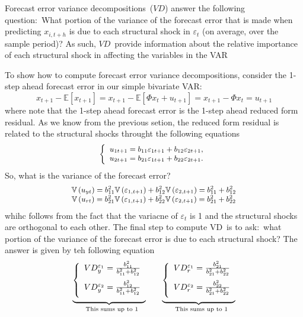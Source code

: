 \documentclass[10pt]{article}
\begin{document}
Forecast error variance decompositions\ ($VD$) answer the following
question:\ What portion of the variance of the forecast error that is made
when predicting $x_{i,t+h}$ is due to each structural shock in $\varepsilon
_{t}$ (on average, over the sample period)? As such, $VD$\ provide
information about the relative importance of each structural shock in
affecting the variables in the VAR

To show how to compute forecast error variance decompositions, consider the
1-step ahead forecast error in our simple bivariate VAR:%
\begin{equation*}
x_{t+1}-\mathbb{E}\left[ x_{t+1}\right] =x_{t+1}-\mathbb{E}\left[ \Phi
x_{t}+u_{t+1}\right] =x_{t+1}-\Phi x_{t}=u_{t+1}
\end{equation*}%
where note that the 1-step ahead forecast error is the 1-step ahead reduced
form residual. As we know from the previous setion, the reduced form
residual is related to the structural shocks throught the following equations%
\begin{equation*}
{\small \left\{
\begin{array}{c}
u_{1t+1}=b_{11}\varepsilon _{1t+1}+b_{12}\varepsilon _{2t+1}, \\
u_{2t+1}=b_{21}\varepsilon _{1t+1}+b_{22}\varepsilon _{2t+1}.%
\end{array}%
\right. }
\end{equation*}%
So, what is the variance of the forecast error?%
\begin{equation*}
{\small
\begin{array}{c}
\mathbb{V}\left( u_{yt}\right) =b_{11}^{2}\mathbb{V}\left( \varepsilon
_{1,t+1}\right) +b_{12}^{2}\mathbb{V}\left( \varepsilon _{2,t+1}\right)
=b_{11}^{2}+b_{12}^{2} \\
\mathbb{V}\left( u_{rt}\right) =b_{21}^{2}\mathbb{V}\left( \varepsilon
_{1,t+1}\right) +b_{22}^{2}\mathbb{V}\left( \varepsilon _{2,t+1}\right)
=b_{21}^{2}+b_{22}^{2}%
\end{array}%
}
\end{equation*}%
whihc follows from the fact that the variacne of $\varepsilon _{t}$ is 1 and
the structural shocks are orthogonal to each other. The final step to
compute VD\ is to ask:\ what portion of the variance of the forecast error
is due to each structural shock? The answer is given by teh following
equation%
\begin{equation*}
\underset{\text{This sums up to 1}}{\underbrace{\left\{
\begin{array}{c}
VD_{y}^{\varepsilon _{1}}=\frac{b_{11}^{2}}{b_{11}^{2}+b_{12}^{2}}\medskip
\\
VD_{y}^{\varepsilon _{2}}=\frac{b_{12}^{2}}{b_{11}^{2}+b_{12}^{2}}\medskip
\end{array}%
\right. }}\ \ \ \ \ \ \underset{\text{This sums up to 1}}{\underbrace{%
\left\{
\begin{array}{c}
VD_{r}^{\varepsilon _{1}}=\frac{b_{21}^{2}}{b_{21}^{2}+b_{22}^{2}}\medskip
\\
VD_{r}^{\varepsilon _{2}}=\frac{b_{22}^{2}}{b_{21}^{2}+b_{22}^{2}}\medskip
\end{array}%
\right. }}
\end{equation*}
\end{document}
